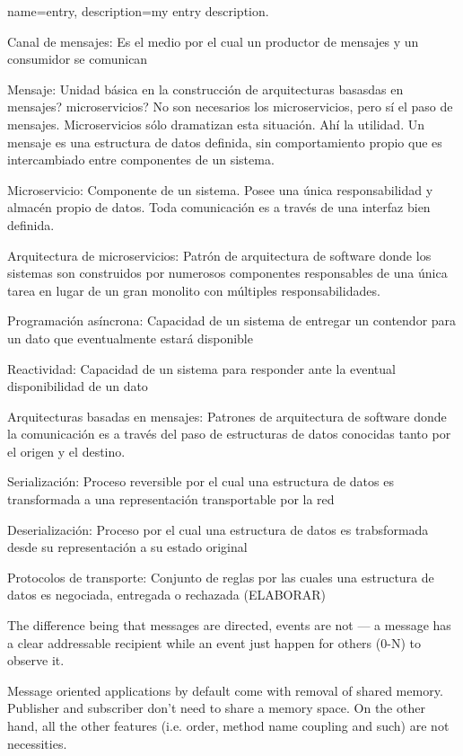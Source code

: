 
{
  name={entry},
  description={my entry description.}
}

\printglossaries

Canal de mensajes: Es el medio por el cual un productor de mensajes y un consumidor se comunican

Mensaje: Unidad básica en la construcción de arquitecturas basasdas en mensajes? microservicios? No son necesarios los microservicios, pero sí el paso de mensajes. Microservicios sólo dramatizan esta situación. Ahí la utilidad.
Un mensaje es una estructura de datos definida, sin comportamiento propio que es intercambiado entre componentes de un sistema.

Microservicio: Componente de un sistema. Posee una única responsabilidad y almacén propio de datos. Toda comunicación es a través de una interfaz bien definida.

Arquitectura de microservicios: Patrón de arquitectura de software donde los sistemas son construidos por numerosos componentes responsables de una única tarea en lugar de un gran monolito con múltiples responsabilidades.

Programación asíncrona: Capacidad de un sistema de entregar un contendor para un dato que eventualmente estará disponible

Reactividad: Capacidad de un sistema para responder ante la eventual disponibilidad de un dato

Arquitecturas basadas en mensajes: Patrones de arquitectura de software donde la comunicación es a través del paso de estructuras de datos conocidas tanto por el origen y el destino.

Serialización: Proceso reversible por el cual una estructura de datos es transformada a una representación transportable por la red

Deserialización: Proceso por el cual una estructura de datos es trabsformada desde su representación a su estado original

Protocolos de transporte: Conjunto de reglas por las cuales una estructura de datos es negociada, entregada o rechazada (ELABORAR) 

The difference being that messages are directed, events are not — a message has a clear addressable recipient while an event just happen for others (0-N) to observe it.

Message oriented applications by default come with removal of shared memory. Publisher and subscriber don't need to share a memory space. On the other hand, all the other features (i.e. order, method name coupling and such) are not necessities.